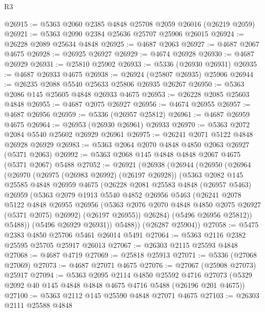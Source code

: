 \begin{lexlean}{R3}
\begin{coremodule}
@26915 := @5363 @2060 @2385 @4848 @25708 @2059 @26016 (@26219 @2059)
@26921 := @5363 @2090 @2384 @25636 @25707 @25906 @26015
@26924 := @26228 @2089 @25634 @4848
@26925 := @4687 @2063
@26927 := @4687 @2067 @4675
@26928 := @26925 @26927
@26929 := @4674 @26928
@26930 := @4687 @26929
@26931 := @25810 @25902
@26933 := @5336 (@26930 @26931)
@26935 := @4687 @26933 @4675
@26938 := @26924 (@25807 @26935) @25906
@26944 := @26235 @2088 @5540 @25633 @25806 @26935 @26267
@26950 := @5363 @2086 @145 @25605 @4848 @26933 @4675
@26953 := @26228 @2085 @25603 @4848
@26955 := @4687 @2075 @26927
@26956 := @4674 @26955
@26957 := @4687 @26956
@26959 := @5336 (@26957 @25812)
@26961 := @4687 @26959 @4675
@26964 := @26953 (@26930 @26961) @26933
@26970 := @5363 @2072 @2084 @5540 @25602 @26929 @26961
@26975 := @26241 @2071 @5122 @4848 @26928 @26929
@26983 := @5363 @2064 @2070 @4848 @4850 @2063 @26927 (@5371 @2063)
@26992 := @5363 @2068 @145 @4848 @4848 @2067 @4675 (@5371 @2067) @5488
@27052 := @26921
    (@26938
      (@26944
        (@26950
          (@26964
            (@26970
              (@26975 (@26983 @26992) (@26197 @26928))
              (@5363
                @2082
                @145
                @25585
                @4848
                @26959
                @4675
                (@26228
                  @2081
                  @25583
                  @4848
                  (@26957 @5463)
                  @26959
                  (@5363
                    @2079
                    @1913
                    @5540
                    @4852
                    @26956
                    @5463
                    (@26241
                      @2078
                      @5122
                      @4848
                      @26955
                      @26956
                      (@5363 @2076 @2070 @4848 @4850 @2075 @26927 (@5371 @2075) @26992)
                      (@26197 @26955))
                    @26284)
                  (@5496 @26956 @25812))
                @5488))
            (@5496 @26929 @26931))
          @5488))
      (@26287 @25904))
@27058 := @5475 @2383 @4850 @25706 @5461 @26014 @5491
@27064 := @5363 @2116 @2382 @25595 @25705 @25917 @26013
@27067 := @26303 @2115 @25593 @4848
@27068 := @4687 @4719
@27069 := @25818 @25913
@27071 := @5336 (@27068 @27069)
@27073 := @4687 @27071 @4675
@27076 := @27067 (@25908 @27073) @25917
@27094 := @5363
    @2095
    @2114
    @4850
    @25592
    @4716
    @27073
    (@5329 @2092 @40 @145 @4848 @4848 @4675 @4716 @5488 (@26196 @201 @4675))
@27100 := @5363 @2112 @145 @25590 @4848 @27071 @4675
@27103 := @26303 @2111 @25588 @4848

\end{coremodule}
\end{lexlean}

